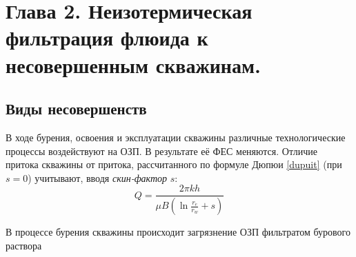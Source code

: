 \section*{Глава 2. Неизотермическая фильтрация флюида к несовершенным скважинам.}

\setcounter{section}{2}
\setcounter{subsection}{0}
\setcounter{equation}{0}


\subsection{Виды несовершенств}
	В ходе бурения, освоения и эксплуатации скважины различные технологические процессы воздействуют на ОЗП.
	В результате её ФЕС меняются.
	Отличие притока скважины от притока, рассчитанного по формуле Дюпюи \eqref{dupuit} (при $s=0$) учитывают, вводя \textit{скин-фактор} $s$:
\begin{equation}
	\label{dupuit}
	Q = \frac{2\pi k h}{\mu B \left(\ln\displaystyle\frac{r_e}{r_w}+s\right)}
\end{equation}

	В процессе бурения скважины происходит загрязнение ОЗП фильтратом бурового раствора